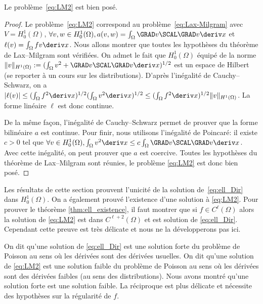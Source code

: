 \documentclass[12pt,a4paper,twoside]{article}
\begin{document}
\begin{proposition}
  Le probl\`eme~\eqref{eq:LM2} est bien pos\'e.
\end{proposition}
\begin{proof}
  Le probl\`eme~\eqref{eq:LM2} correspond au probl\`eme~\eqref{eq:Lax-Milgram}
  avec $V = H_0^1(\Omega)$, 
  $\forall v, w \in H_0^1(\Omega), a(v,w) = \int_{\Omega} \GRAD v \SCAL \GRAD v \deriv x$
  et $\ell(v) = \int_{\Omega} f v \deriv x$.
  Nous allons montrer que toutes les hypoth\`eses du th\'eor\`eme de Lax--Milgram
  sont v\'erifi\'ees.
  On admet le fait que $H_0^1(\Omega)$ \'equip\'e de la norme 
  $\| v \|_{H^1(\Omega)} := (\int_{\Omega} v^2 + \GRAD v \SCAL \GRAD v \deriv x)^{1/2}$ 
  est un espace de Hilbert (se reporter \`a un cours sur les distributions).
  D'apr\`es l'in\'egalit\'e de Cauchy--Schwarz, on a 
  $|\ell(v)| \leq (\int_{\Omega} f^2 \deriv x)^{1/2} (\int_{\Omega} v^2 \deriv x)^{1/2}
  \leq (\int_{\Omega} f^2 \deriv x)^{1/2} \| v \|_{H^1(\Omega)}$.
  La forme lin\'eaire $\ell$ est donc continue. 
  
  
  De la m\^eme fa\c{c}on, l'in\'egalit\'e de Cauchy--Schwarz permet de prouver
  que la forme bilin\'eaire $a$ est continue.
  Pour finir, nous utilisons l'in\'egalit\'e de Poincar\'e: il existe $c>0$
  tel que $\forall v \in H_0^1(\Omega), 
  \int_{\Omega} v^2 \deriv x \leq c \int_{\Omega} \GRAD v \SCAL \GRAD v \deriv x$.
  Avec cette in\'egalit\'e, on peut prouver que $a$ est coercive.
  Toutes les hypoth\`eses du th\'eor\`eme de Lax--Milgram sont r\'eunies,
  le probl\`eme \eqref{eq:LM2} est donc bien pos\'e.
\end{proof}

\begin{remark}
  Les r\'esultats de cette section prouvent l'unicit\'e de la solution
  de~\eqref{eq:ell_Dir} dans $H_0^1(\Omega)$. On a \'egalement prouv\'e l'existence d'une
  solution \`a \eqref{eq:LM2}. Pour prouver le th\'eor\`eme
  \ref{thm:ell_existence}, il faut montrer que si $f \in C^{\ell}(\Omega)$
  alors la solution de \eqref{eq:LM2} est dans $C^{\ell+2}(\Omega)$
  et est solution de \eqref{eq:ell_Dir}. Cependant cette preuve est 
  tr\`es d\'elicate et nous ne la d\'evelopperons pas ici.
\end{remark}


\begin{remark}
  On dit qu'une solution de \eqref{eq:ell_Dir}
  est une solution forte du probl\`eme de Poisson au sens
  o\`u les d\'eriv\'ees sont des d\'eriv\'ees usuelles.
  On dit qu'une solution de \eqref{eq:LM2} est une solution
  faible du probl\`eme de Poisson au sens o\`u les d\'eriv\'ees
  sont des d\'eriv\'ees faibles (au sens des distributions).
  Nous avons montr\'e qu'une solution forte est une solution faible.
  La r\'eciproque est plus d\'elicate et n\'ecessite des hypoth\`eses
  sur la r\'egularit\'e de $f$.
\end{remark}
\end{document}
